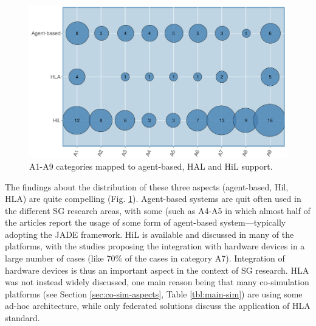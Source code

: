\documentclass[1p]{elsarticle} %
\begin{document}
\begin{figure}[!htb]
\centering
\includegraphics[width=0.99\linewidth]{img/SMS-agent-hla-hil.png}
\caption{A1-A9 categories mapped to agent-based, HAL and HiL support.}
\label{fig:map-A1-A9-AB-HAL-HIL}
\end{figure}


The findings about the distribution of these three aspects (agent-based, Hil, HLA) are quite compelling (Fig. \ref{fig:map-A1-A9-AB-HAL-HIL}). Agent-based systems are quit often used in the different SG research areas, with some (such as A4-A5 in which almost half of the articles report the usage of some form of agent-based system---typically adopting the JADE framework.
HiL is available and discussed in many of the platforms, with the studies proposing the integration with hardware devices in a large number of cases (like 70\% of the cases in category A7). Integration of hardware devices is thus an important aspect in the context of SG research.
HLA was not instead widely discussed, one main reason being that many co-simulation platforms (see Section \ref{sec:co-sim-aspects}, Table \ref{tbl:main-sim}) are using some ad-hoc architecture, while only federated solutions discuss the application of HLA standard.
\end{document}
